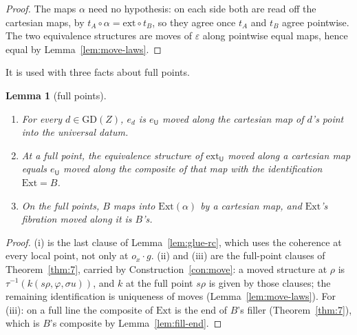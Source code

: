 \documentclass[11pt]{article}
\newcommand{\U}{\mathsf{U}}
\newcommand{\Ext}{\mathrm{Ext}}
\newcommand{\ext}{\mathrm{ext}}
\newcommand{\GD}{\mathrm{GD}}
\theoremstyle{plain}
\newtheorem{lemma}[theorem]{Lemma}
\theoremstyle{definition}
\theoremstyle{remark}
\begin{document}
\begin{proof}
The maps $\alpha$ need no hypothesis: on each side both are read off
the cartesian maps, by $t_A\circ\alpha=\ext\circ t_B$, so they agree
once $t_A$ and $t_B$ agree pointwise. The two equivalence structures are
moves of $\varepsilon$ along pointwise equal maps, hence equal by
Lemma~\ref{lem:move-laws}.
\end{proof}

It is used with three facts about full points.

\begin{lemma}[full points]\label{lem:full-move}
\begin{enumerate}
\item[(i)] For every $d\in\GD(Z)$, $e_d$ is $e_\U$ moved along the
  cartesian map of $d$'s point into the universal datum.
\item[(ii)] At a full point, the equivalence structure of $\ext_\U$ moved
  along a cartesian map equals $e_\U$ moved along the composite of that
  map with the identification $\Ext=B$.
\item[(iii)] On the full points, $B$ maps into $\Ext(\alpha)$ by a
  cartesian map, and $\Ext$'s fibration moved along it is $B$'s.
\end{enumerate}
\end{lemma}

\begin{proof}
(i) is the last clause of Lemma~\ref{lem:glue-rc}, which uses the
coherence at every local point, not only at $o_x\cdot g$. (ii) and (iii) are the full-point clauses of
Theorem~\ref{thm:7}, carried by Construction~\ref{con:move}: a moved
structure at $\rho$ is $\tau^{-1}(k(s\rho,\varphi,\sigma u))$, and $k$
at the full point $s\rho$ is given by those clauses; the remaining
identification is uniqueness of moves (Lemma~\ref{lem:move-laws}). For
(iii): on a full line the composite of $\Ext$ is the end of $B$'s filler
(Theorem~\ref{thm:7}), which is $B$'s composite by
Lemma~\ref{lem:fill-end}.
\end{proof}
\end{document}
